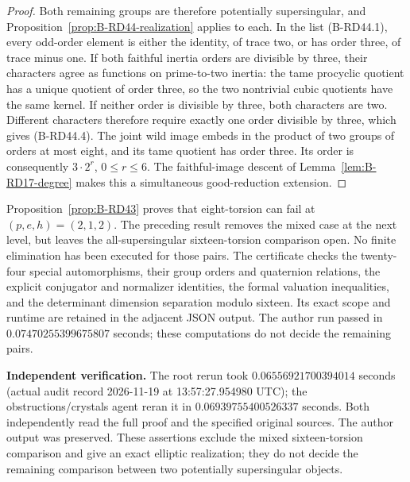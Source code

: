 \begin{proof}
Both remaining groups are therefore potentially supersingular,
and Proposition~\ref{prop:B-RD44-realization} applies to each.
In the list (B-RD44.1), every odd-order element is either the
identity, of trace two, or has order three, of trace minus one.
If both faithful inertia orders are divisible by three, their
characters agree as functions on prime-to-two inertia: the tame
procyclic quotient has a unique quotient of order three, so the
two nontrivial cubic quotients have the same kernel. If neither
order is divisible by three, both characters are two. Different
characters therefore require exactly one order divisible by three,
which gives (B-RD44.4). The joint wild image embeds in the product
of two groups of orders at most eight, and its tame quotient has
order three. Its order is consequently $3\cdot2^r$, $0\le r\le6$.
The faithful-image descent of Lemma~\ref{lem:B-RD17-degree}
makes this a simultaneous good-reduction extension.
\end{proof}

\begin{remark}\label{auto:B:e906eee05992}

Proposition~\ref{prop:B-RD43} proves that eight-torsion can fail
at $(p,e,h)=(2,1,2)$. The preceding result removes the mixed
case at the next level, but leaves the all-supersingular
sixteen-torsion comparison open. No finite elimination has been
executed for those pairs.
The certificate 
checks the twenty-four special automorphisms, their group orders
and quaternion relations, the explicit conjugator and normalizer
identities, the formal valuation inequalities, and the determinant
dimension separation modulo sixteen. Its exact scope and runtime
are retained in the adjacent JSON output. The author run passed
in $0.07470255399675807$ seconds; these computations do
not decide the remaining pairs.
\end{remark}

\par\smallskip\noindent\textbf{Independent verification.}
The root rerun took
$0.06556921700394014$ seconds (actual audit record
2026-11-19 at 13:57:27.954980 UTC); the obstructions/crystals
agent reran it in $0.06939755400526337$ seconds.
Both independently read the full proof and the specified original
sources. The author output was preserved. These assertions exclude
the mixed sixteen-torsion comparison and give an exact elliptic
realization; they do not decide the remaining comparison between
two potentially supersingular objects.


